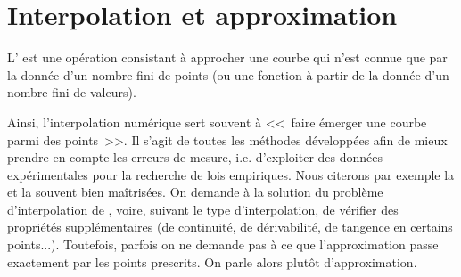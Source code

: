 \chapter{Interpolation et approximation}\label{chap-interpolation} 


\medskip
L' est une opération consistant à approcher une courbe qui n'est connue que par la donnée d'un nombre fini de points (ou une fonction à partir de la donnée d'un nombre fini de valeurs). 

Ainsi, l'interpolation numérique sert souvent à <<~faire émerger une courbe parmi des points~>>. Il s'agit de toutes les méthodes développées afin de mieux prendre en compte les erreurs de mesure, i.e. d'exploiter des données expérimentales pour la recherche de lois empiriques. Nous citerons par exemple la  et la  souvent bien maîtrisées. On demande à la solution du problème d'interpolation de , voire, suivant le type d'interpolation, de vérifier des propriétés supplémentaires (de continuité, de dérivabilité, de tangence en certains points...). Toutefois, parfois on ne demande pas à ce que l'approximation passe exactement par les points prescrits. On parle alors plutôt d'approximation. 


